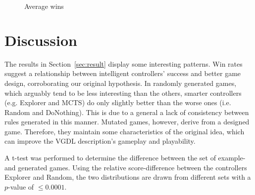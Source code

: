 \documentclass{llncs}
\begin{document}
\begin{figure}[!ht]
\centering
{}
\caption{Average wins}
\label{graph:winrate}
\end{figure}


\section{Discussion}

The results in Section~\ref{sec:result} display some interesting patterns. Win rates suggest a relationship between intelligent controllers' success and better game design, corroborating our original hypothesis. In randomly generated games, which arguably tend to be less interesting than the others, smarter controllers (e.g. Explorer and MCTS) do only slightly better than the worse ones (i.e. Random and DoNothing). This is due to a general a lack of consistency between rules generated in this manner. Mutated games, however, derive from a designed game. Therefore, they maintain some characteristics of the original idea, which can improve the VGDL description's gameplay and playability.

A t-test was performed to determine the difference between the set of example- and generated games. Using the relative score-difference between the controllers Explorer and Random, the two distributions are drawn from different sets with a $p$-value of $\le 0.0001$.
\end{document}
